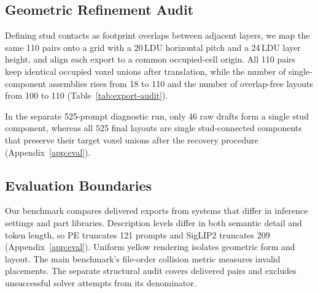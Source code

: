 \subsection{Geometric Refinement Audit}
\label{sec:diagnostics}
Defining stud contacts as footprint overlaps between adjacent layers, we map the same 110 pairs onto a grid with a 20\,LDU horizontal pitch and a 24\,LDU layer height, and align each export to a common occupied-cell origin. All 110 pairs keep identical occupied voxel unions after translation, while the number of single-component assemblies rises from 18 to 110 and the number of overlap-free layouts from 100 to 110 (Table~\ref{tab:export-audit}).


In the separate 525-prompt diagnostic run, only 46 raw drafts form a single stud component, whereas all 525 final layouts are single stud-connected components that preserve their target voxel unions after the recovery procedure (Appendix~\ref{app:eval}).

\subsection{Evaluation Boundaries}
Our benchmark compares delivered exports from systems that differ in inference settings and part libraries. Description levels differ in both semantic detail and token length, so PE truncates 121 prompts and SigLIP2 truncates 209 (Appendix~\ref{app:eval}). Uniform yellow rendering isolates geometric form and layout. The main benchmark's file-order collision metric measures invalid placements. The separate structural audit covers delivered pairs and excludes unsuccessful solver attempts from its denominator.
